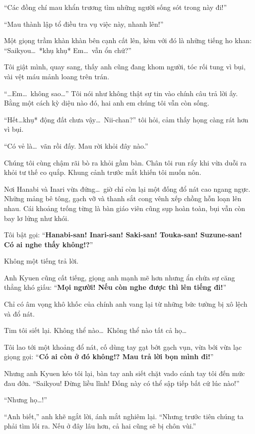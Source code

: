 \documentclass[../main.tex]{subfiles}
\begin{document}
``Các đồng chí mau khẩn trương tìm những người sống sót trong này đi!''

``Mau thành lập tổ điều tra vụ việc này, nhanh lên!''

Một giọng trầm khàn khàn bên cạnh cất lên, kèm với đó là những tiếng ho khan: ``Saikyou\dots\ *khụ khụ* Em\dots\ vẫn ổn chứ?''

Tôi giật mình, quay sang, thấy anh cũng đang khom người, tóc rối tung vì bụi, vài vệt máu mảnh loang trên trán.

``\dots Em\dots\ không sao\dots'' Tôi nói như không thật sự tin vào chính câu trả lời ấy. Bằng một cách kỳ diệu nào đó, hai anh em chúng tôi vẫn còn sống.

``Hết\dots *khụ* động đất chưa vậy\dots\ Nii-chan?'' tôi hỏi, cảm thấy họng càng rát hơn vì bụi.

``Có vẻ là\dots\ vãn rồi đấy. Mau rời khỏi đây nào.''

Chúng tôi cùng chậm rãi bò ra khỏi gầm bàn. Chân tôi run rẩy khi vừa duỗi ra khỏi tư thế co quắp. Khung cảnh trước mắt khiến tôi muốn nôn.

Nơi Hanabi và Inari vừa đứng\dots\ giờ chỉ còn lại một đống đổ nát cao ngang ngực. Những mảng bê tông, gạch vỡ và thanh sắt cong vênh xếp chồng hỗn loạn lên nhau. Cái khoảng trống từng là bàn giáo viên cũng sụp hoàn toàn, bụi vẫn còn bay lơ lửng như khói.


Tôi bật gọi: ``\textbf{Hanabi-san! Inari-san! Saki-san! Touka-san! Suzune-san! Có ai nghe thấy không!?}''

Không một tiếng trả lời.

Anh Kyuen cũng cất tiếng, giọng anh mạnh mẽ hơn nhưng ẩn chứa sự căng thẳng khó giấu: ``\textbf{Mọi người! Nếu còn nghe được thì lên tiếng đi!}''

Chỉ có âm vọng khô khốc của chính anh vang lại từ những bức tường bị xô lệch và đổ nát.

Tim tôi siết lại. Không thể nào\dots\ Không thể nào tất cả họ\dots

Tôi lao tới một khoảng đổ nát, cố dùng tay gạt bớt gạch vụn, vừa bới vừa lạc giọng gọi: ``\textbf{Có ai còn ở đó không!? Mau trả lời bọn mình đi!}''

Nhưng anh Kyuen kéo tôi lại, bàn tay anh siết chặt vado cánh tay tôi đến mức đau đớn. ``Saikyou! Đừng liều lĩnh! Đống này có thể sập tiếp bất cứ lúc nào!''

``Nhưng họ\dots!''

``Anh biết,'' anh khẽ ngắt lời, ánh mắt nghiêm lại. ``Nhưng trước tiên chúng ta phải tìm lối ra. Nếu ở đây lâu hơn, cả hai cũng sẽ bị chôn vùi.''
\end{document}
